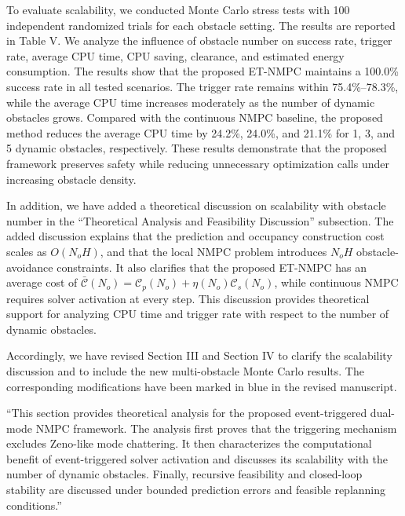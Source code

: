 \documentclass[12pt, twosides]{article}
\theoremstyle{definition}
\begin{document}
To evaluate scalability, we conducted Monte Carlo stress tests with 100 independent randomized trials for each obstacle setting. The results are reported in Table V. We analyze the influence of obstacle number on success rate, trigger rate, average CPU time, CPU saving, clearance, and estimated energy consumption.
The results show that the proposed ET-NMPC maintains a 100.0\% success rate in all tested scenarios. The trigger rate remains within 75.4\%--78.3\%, while the average CPU time increases moderately as the number of dynamic obstacles grows. Compared with the continuous NMPC baseline, the proposed method reduces the average CPU time by 24.2\%, 24.0\%, and 21.1\% for 1, 3, and 5 dynamic obstacles, respectively. These results demonstrate that the proposed framework preserves safety while reducing unnecessary optimization calls under increasing obstacle density.

In addition, we have added a theoretical discussion on scalability with obstacle number in the ``Theoretical Analysis and Feasibility Discussion'' subsection. The added discussion explains that the prediction and occupancy construction cost scales as $O(N_oH)$, and that the local NMPC problem introduces $N_oH$ obstacle-avoidance constraints. It also clarifies that the proposed ET-NMPC has an average cost of $\bar{\mathcal{C}}(N_o)=\mathcal{C}_{p}(N_o)+\eta(N_o)\mathcal{C}_{s}(N_o)$, while continuous NMPC requires solver activation at every step. This discussion provides theoretical support for analyzing CPU time and trigger rate with respect to the number of dynamic obstacles.

Accordingly, we have revised Section III and Section IV to clarify the scalability discussion and to include the new multi-obstacle Monte Carlo results. The corresponding modifications have been marked in blue in the revised manuscript.

``This section provides theoretical analysis for the proposed event-triggered dual-mode NMPC framework. The analysis first proves that the triggering mechanism excludes Zeno-like mode chattering. It then characterizes the computational benefit of event-triggered solver activation and discusses its scalability with the number of dynamic obstacles. Finally, recursive feasibility and closed-loop stability are discussed under bounded prediction errors and feasible replanning conditions.''
\end{document}
